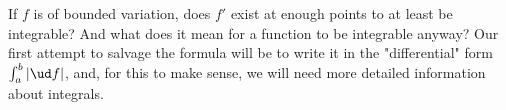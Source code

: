 %
\begin{question}
	If $f$ is of bounded variation,
	does $f'$ exist at enough points to at least be integrable? And what does it mean for a
	function to be integrable anyway? Our first attempt to salvage the formula will be to
	write it in the "differential" form $\int_{a}^{b}\left|\ud f\right|$, and, for this to make sense, we will need
	more detailed information about integrals.
\end{question}
